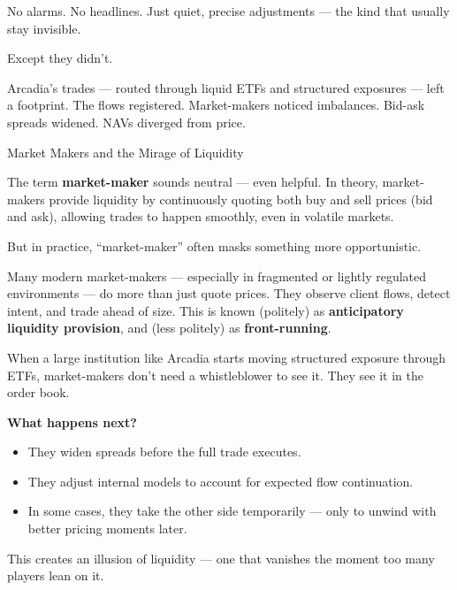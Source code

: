 \medskip

No alarms.  
No headlines.  
Just quiet, precise adjustments — the kind that usually stay invisible.

Except they didn’t.

Arcadia’s trades — routed through liquid ETFs and structured exposures — left a footprint.  
The flows registered.  
Market-makers noticed imbalances.  
Bid-ask spreads widened.  
NAVs diverged from price.

\begin{TechnicalSidebar}{Market Makers and the Mirage of Liquidity}

  The term \textbf{market-maker} sounds neutral — even helpful.  
  In theory, market-makers provide liquidity by continuously quoting both buy and sell prices (bid and ask), allowing trades to happen smoothly, even in volatile markets.
  
  \medskip
  
  But in practice, “market-maker” often masks something more opportunistic.

  \medskip
  
  Many modern market-makers — especially in fragmented or lightly regulated environments — do more than just quote prices.  
  They observe client flows, detect intent, and trade ahead of size. This is known (politely) as \textbf{anticipatory liquidity provision}, and (less politely) as \textbf{front-running}.
  
  \medskip
  
  When a large institution like Arcadia starts moving structured exposure through ETFs,  
  market-makers don’t need a whistleblower to see it. They see it in the order book.
  
  \medskip
  
  \textbf{What happens next?}
  
  \begin{itemize}
    \item They widen spreads before the full trade executes.
    \item They adjust internal models to account for expected flow continuation.
    \item In some cases, they take the other side temporarily — only to unwind with better pricing moments later.
  \end{itemize}
  
  This creates an illusion of liquidity — one that vanishes the moment too many players lean on it.
  
  \medskip
  

\end{TechnicalSidebar}
